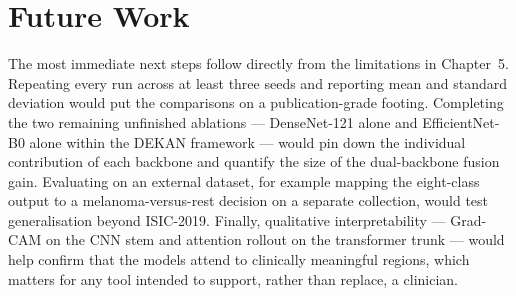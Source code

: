 \section{Future Work}

The most immediate next steps follow directly from the limitations in
Chapter~5. Repeating every run across at least three seeds and reporting mean and
standard deviation would put the comparisons on a publication-grade footing.
Completing the two remaining unfinished ablations --- DenseNet-121 alone and
EfficientNet-B0 alone within the DEKAN framework --- would pin down the
individual contribution of each backbone and quantify the size of the
dual-backbone fusion gain. Evaluating on an external dataset, for example mapping
the eight-class output to a melanoma-versus-rest decision on a separate
collection, would test generalisation beyond ISIC-2019. Finally, qualitative
interpretability --- Grad-CAM on the CNN stem and attention rollout on the
transformer trunk --- would help confirm that the models attend to clinically
meaningful regions, which matters for any tool intended to support, rather than
replace, a clinician.
